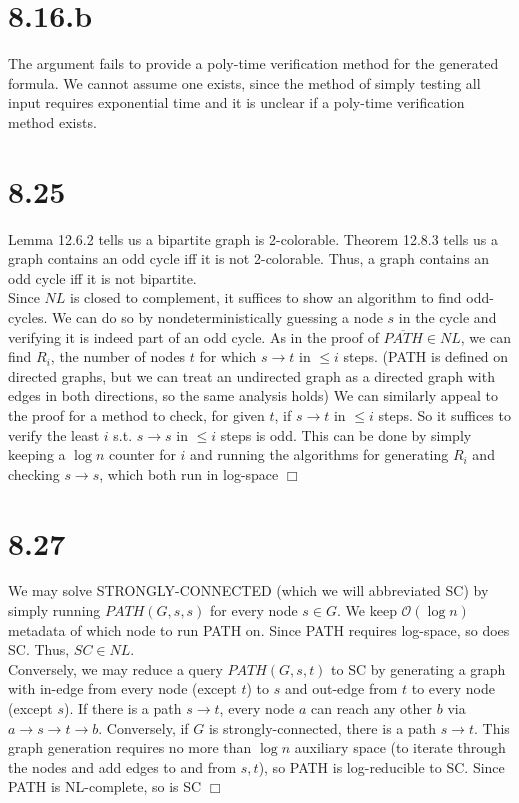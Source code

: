 \documentclass{article}
\begin{document}
\section*{8.16.b}
The argument fails to provide a poly-time verification method for the generated formula. We cannot assume one exists, since the method of simply testing all input requires exponential time and it is unclear if a poly-time verification method exists.

\section*{8.25}
Lemma 12.6.2 tells us a bipartite graph is 2-colorable. Theorem 12.8.3 tells us a graph contains an odd cycle iff it is not 2-colorable. Thus, a graph contains an odd cycle iff it is not bipartite.\\
Since $NL$ is closed to complement, it suffices to show an algorithm to find odd-cycles. We can do so by nondeterministically guessing a node $s$ in the cycle and verifying it is indeed part of an odd cycle. As in the proof of $\overline{PATH} \in NL$, we can find $R_i$, the number of nodes $t$ for which $s \to t$ in $\leqslant i$ steps. (PATH is defined on directed graphs, but we can treat an undirected graph as a directed graph with edges in both directions, so the same analysis holds) We can similarly appeal to the proof for a method to check, for given $t$, if $s \to t$ in $\leqslant i$ steps. So it suffices to verify the least $i$ s.t. $s \to s$ in $\leqslant i$ steps is odd. This can be done by simply keeping a $\log n$ counter for $i$ and running the algorithms for generating $R_i$ and checking $s \to s$, which both run in log-space $\Box$

\section*{8.27}
We may solve STRONGLY-CONNECTED (which we will abbreviated SC) by simply running $PATH(G,s,s)$ for every node $s \in G$. We keep $\mathcal{O}(\log n)$ metadata of which node to run PATH on. Since PATH requires log-space, so does SC. Thus, $SC \in NL$.\\
Conversely, we may reduce a query $PATH(G,s,t)$ to SC by generating a graph with in-edge from every node (except $t$) to $s$ and out-edge from $t$ to every node (except $s$). If there is a path $s \to t$, every node $a$ can reach any other $b$ via $a \to s \to t \to b$. Conversely, if $G$ is strongly-connected, there is a path $s \to t$. This graph generation requires no more than $\log n$ auxiliary space (to iterate through the nodes and add edges to and from $s,t$), so PATH is log-reducible to SC. Since PATH is NL-complete, so is SC $\Box$
\end{document}
